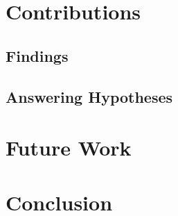 \section{Contributions}      

\subsection{Findings}

\subsection{Answering Hypotheses}



\section{Future Work}      




\section{Conclusion}      


